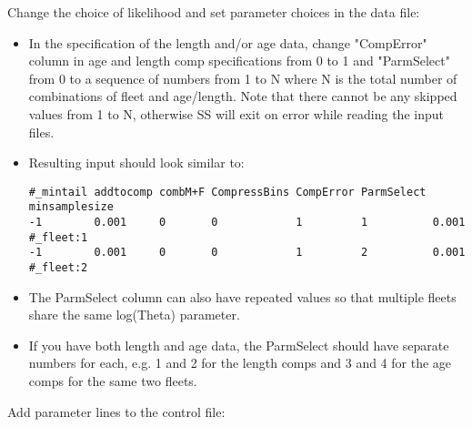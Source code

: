 
Change the choice of likelihood and set parameter choices in the data file:

\begin{itemize}
	\item In the specification of the length and/or age data, change "CompError" column in age and length comp specifications from 0 to 1 and "ParmSelect" from 0 to a sequence of numbers from 1 to N where N is the total number of combinations of fleet and age/length. Note that there cannot be any skipped values from 1 to N, otherwise SS will exit on error while reading the input files.
	
	\item Resulting input should look similar to:
\begin{small}
\begin{verbatim}
#_mintail addtocomp combM+F CompressBins CompError ParmSelect minsamplesize   
-1        0.001     0       0            1         1          0.001 #_fleet:1
-1        0.001     0       0            1         2          0.001 #_fleet:2
\end{verbatim}
\end{small}

	\item The ParmSelect column can also have repeated values so that multiple fleets share the same log(Theta) parameter.
	
	\item If you have both length and age data, the ParmSelect should have separate numbers for each, e.g. 1 and 2 for the length comps and 3 and 4 for the age comps for the same two fleets.
	
\end{itemize}

Add parameter lines to the control file:

